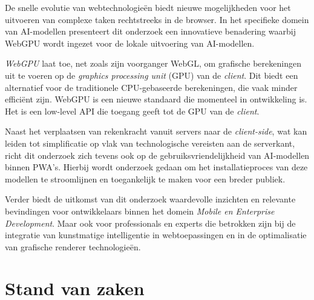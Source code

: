 \bigbreak{}
De snelle evolutie van webtechnologieën biedt nieuwe mogelijkheden voor het uitvoeren van complexe taken rechtstreeks in de browser. In het specifieke domein van AI-modellen presenteert dit onderzoek een innovatieve benadering waarbij WebGPU wordt ingezet voor de lokale uitvoering van AI-modellen.

\bigbreak{}
\textit{WebGPU} laat toe, net zoals zijn voorganger WebGL, om grafische berekeningen uit te voeren op de \textit{graphics processing unit} (GPU) van de \textit{client}. Dit biedt een alternatief voor de traditionele CPU-gebaseerde berekeningen, die vaak minder efficiënt zijn. WebGPU is een nieuwe standaard die momenteel in ontwikkeling is. Het is een low-level API die toegang geeft tot de GPU van de \textit{client}.

\bigbreak{}
Naast het verplaatsen van rekenkracht vanuit servers naar de \textit{client-side}, wat kan leiden tot simplificatie op vlak van technologische vereisten aan de serverkant, richt dit onderzoek zich tevens ook op de gebruiksvriendelijkheid van AI-modellen binnen PWA's. Hierbij wordt onderzoek gedaan om het installatieproces van deze modellen te stroomlijnen en toegankelijk te maken voor een breder publiek.

\bigbreak{}
Verder biedt de uitkomst van dit onderzoek waardevolle inzichten en relevante bevindingen voor ontwikkelaars binnen het domein \textit{Mobile en Enterprise Development}. Maar ook voor professionals en experts die betrokken zijn bij de integratie van kunstmatige intelligentie in webtoepassingen en in de optimalisatie van grafische renderer technologieën.

\newpage

\section{Stand van zaken}%
\label{sec:stand van zaken}



